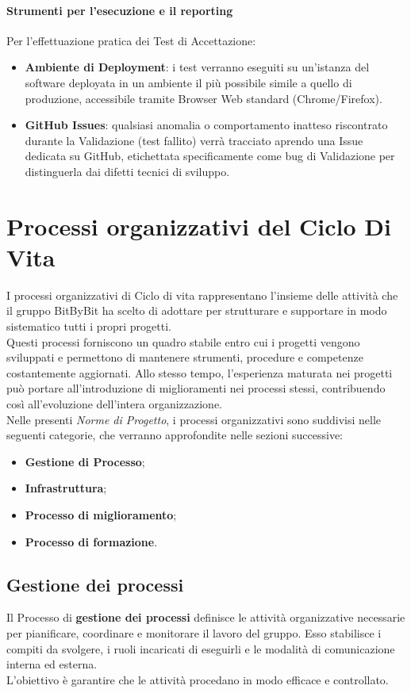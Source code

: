 \documentclass[a4paper,12pt]{article}
\begin{document}
\paragraph{Strumenti per l'esecuzione e il reporting}
Per l'effettuazione pratica dei Test di Accettazione:
\begin{itemize}
    \item \textbf{Ambiente di Deployment}: i test verranno eseguiti su un'istanza del software deployata in un ambiente il più possibile simile a quello di produzione, accessibile tramite Browser Web standard (Chrome/Firefox).
    \item \textbf{GitHub Issues}: qualsiasi anomalia o comportamento inatteso riscontrato durante la Validazione (test fallito) verrà tracciato aprendo una Issue dedicata su GitHub, etichettata specificamente come bug di Validazione per distinguerla dai difetti tecnici di sviluppo.
\end{itemize}

\section{Processi organizzativi del Ciclo Di Vita}
I processi organizzativi di Ciclo di vita rappresentano l’insieme delle attività che il gruppo BitByBit ha scelto di adottare per strutturare e supportare in modo sistematico tutti i propri progetti.\\
Questi processi forniscono un quadro stabile entro cui i progetti vengono sviluppati e permettono di mantenere strumenti, procedure e competenze costantemente aggiornati. Allo stesso tempo, l’esperienza maturata nei progetti può portare all’introduzione di miglioramenti nei processi stessi, contribuendo così all’evoluzione dell’intera organizzazione.\\
Nelle presenti \textit{Norme di Progetto}, i processi organizzativi sono suddivisi nelle seguenti categorie, che verranno approfondite nelle sezioni successive:
\begin{itemize}
    \item \textbf{Gestione di Processo};
    \item \textbf{Infrastruttura};
    \item \textbf{Processo di miglioramento};
    \item \textbf{Processo di formazione}.
\end{itemize}

\subsection{Gestione dei processi} \label{sec:gestione-processi}
Il Processo di \textbf{gestione dei processi} definisce le attività organizzative necessarie per pianificare, coordinare e monitorare il lavoro del gruppo. Esso stabilisce i compiti da svolgere, i ruoli incaricati di eseguirli e le modalità di comunicazione interna ed esterna.\\
L’obiettivo è garantire che le attività procedano in modo efficace e controllato.
\end{document}
